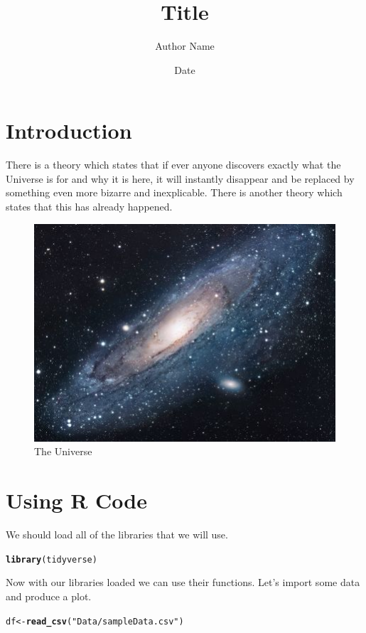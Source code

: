 \documentclass{article}\usepackage[]{graphicx}\usepackage[]{color}
\title{Title}
\author{Author Name}
\date{Date}
\makeatletter
\newcommand{\hlstr}[1]{\textcolor[rgb]{0.192,0.494,0.8}{#1}}%
\newcommand{\hlstd}[1]{\textcolor[rgb]{0.345,0.345,0.345}{#1}}%
\newcommand{\hlkwb}[1]{\textcolor[rgb]{0.69,0.353,0.396}{#1}}%
\newcommand{\hlkwd}[1]{\textcolor[rgb]{0.737,0.353,0.396}{\textbf{#1}}}%
\newenvironment{kframe}{%
 \def\at@end@of@kframe{}%
 \ifinner\ifhmode%
  \def\at@end@of@kframe{\end{minipage}}%
  \begin{minipage}{\columnwidth}%
 \fi\fi%
 \def\FrameCommand##1{\hskip\@totalleftmargin \hskip-\fboxsep
 \colorbox{shadecolor}{##1}\hskip-\fboxsep
     \hskip-\linewidth \hskip-\@totalleftmargin \hskip\columnwidth}%
 \MakeFramed {\advance\hsize-\width
   \@totalleftmargin\z@ \linewidth\hsize
   \@setminipage}}%
 {\par\unskip\endMakeFramed%
 \at@end@of@kframe}
\newenvironment{knitrout}{}{} %
\makeatother
\begin{document}
\maketitle

\section{Introduction}
There is a theory which states that if ever anyone discovers exactly what the Universe is for and why it is here, it will instantly disappear and be replaced by something even more bizarre and inexplicable.
There is another theory which states that this has already happened.

\begin{figure}[h!]
\centering
\includegraphics[scale=1.7]{universe}
\caption{The Universe}
\label{fig:universe}
\end{figure}

\section{Using R Code}

We should load all of the libraries that we will use. 
\begin{knitrout}
\color{fgcolor}\begin{kframe}
\begin{alltt}
\hlkwd{library}\hlstd{(tidyverse)}
\end{alltt}
\end{kframe}
\end{knitrout}

Now with our libraries loaded we can use their functions. Let's import some data and produce a plot. 
\begin{knitrout}
\color{fgcolor}\begin{kframe}
\begin{alltt}
\hlstd{df} \hlkwb{<-} \hlkwd{read_csv}\hlstd{(}\hlstr{"Data/sampleData.csv"}\hlstd{)}
\end{alltt}
\end{kframe}
\end{knitrout}
\end{document}
